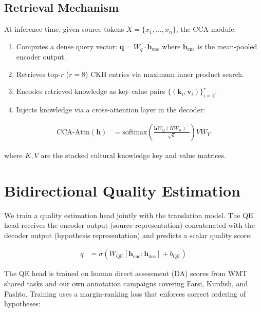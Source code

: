 \documentclass[11pt,twocolumn]{article}
\begin{document}
\subsection{Retrieval Mechanism}

At inference time, given source tokens $X = \{x_1, \ldots, x_n\}$, the CCA
module:
\begin{enumerate}[leftmargin=*,noitemsep]
  \item Computes a dense query vector: $\mathbf{q} = W_q \cdot \bar{\mathbf{h}}_{\text{enc}}$
        where $\bar{\mathbf{h}}_{\text{enc}}$ is the mean-pooled encoder output.
  \item Retrieves top-$r$ ($r=8$) CKB entries via maximum inner product search.
  \item Encodes retrieved knowledge as key-value pairs
        $\{(\mathbf{k}_i, \mathbf{v}_i)\}_{i=1}^r$.
  \item Injects knowledge via a cross-attention layer in the decoder:
\end{enumerate}

\begin{align}
  \text{CCA-Attn}(\mathbf{h}) &= \text{softmax}\!\left(\frac{\mathbf{h} W_Q (K W_K)^\top}{\sqrt{d}}\right) V W_V
\end{align}

where $K, V$ are the stacked cultural knowledge key and value matrices.

\section{Bidirectional Quality Estimation}
\label{sec:qe}

We train a quality estimation head jointly with the translation model.
The QE head receives the encoder output (source representation) concatenated
with the decoder output (hypothesis representation) and predicts a scalar
quality score:

\begin{align}
  q &= \sigma(W_{\text{QE}}[\mathbf{h}_{\text{enc}}; \mathbf{h}_{\text{dec}}] + b_{\text{QE}})
\end{align}

The QE head is trained on human direct assessment (DA) scores from WMT shared
tasks and our own annotation campaigns covering Farsi, Kurdish, and Pashto.
Training uses a margin-ranking loss that enforces correct ordering of hypotheses:
\end{document}
